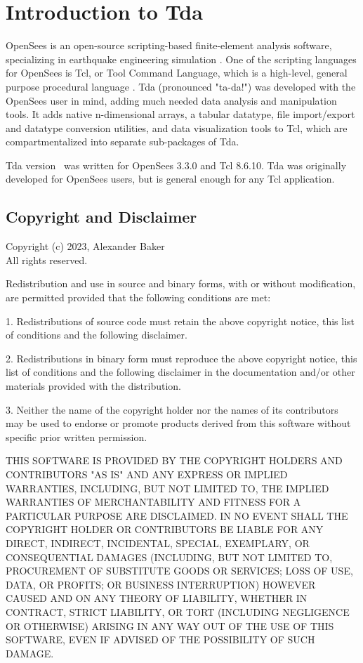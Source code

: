 \chapter*{Introduction to Tda}
OpenSees is an open-source scripting-based finite-element analysis software, specializing in earthquake engineering simulation \cite{mckenna_nonlinear_2010}. 
One of the scripting languages for OpenSees is Tcl, or Tool Command Language, which is a high-level, general purpose procedural language \cite{ousterhout_tcl_1989}. 
Tda (pronounced "ta-da!") was developed with the OpenSees user in mind, adding much needed data analysis and manipulation tools. 
It adds native n-dimensional arrays, a tabular datatype, file import/export and datatype conversion utilities, and data visualization tools to Tcl, which are compartmentalized into separate sub-packages of Tda.

Tda version \version\ was written for OpenSees 3.3.0 and Tcl 8.6.10. 
Tda was originally developed for OpenSees users, but is general enough for any Tcl application. 

\cleartooddpage[\thispagestyle{empty}]
\section*{Copyright and Disclaimer}

Copyright (c) 2023, Alexander Baker \\
All rights reserved.

Redistribution and use in source and binary forms, with or without
modification, are permitted provided that the following conditions are met:

1. Redistributions of source code must retain the above copyright notice, this
   list of conditions and the following disclaimer.

2. Redistributions in binary form must reproduce the above copyright notice,
   this list of conditions and the following disclaimer in the documentation
   and/or other materials provided with the distribution.

3. Neither the name of the copyright holder nor the names of its
   contributors may be used to endorse or promote products derived from
   this software without specific prior written permission.

THIS SOFTWARE IS PROVIDED BY THE COPYRIGHT HOLDERS AND CONTRIBUTORS "AS IS"
AND ANY EXPRESS OR IMPLIED WARRANTIES, INCLUDING, BUT NOT LIMITED TO, THE
IMPLIED WARRANTIES OF MERCHANTABILITY AND FITNESS FOR A PARTICULAR PURPOSE ARE
DISCLAIMED. IN NO EVENT SHALL THE COPYRIGHT HOLDER OR CONTRIBUTORS BE LIABLE
FOR ANY DIRECT, INDIRECT, INCIDENTAL, SPECIAL, EXEMPLARY, OR CONSEQUENTIAL
DAMAGES (INCLUDING, BUT NOT LIMITED TO, PROCUREMENT OF SUBSTITUTE GOODS OR
SERVICES; LOSS OF USE, DATA, OR PROFITS; OR BUSINESS INTERRUPTION) HOWEVER
CAUSED AND ON ANY THEORY OF LIABILITY, WHETHER IN CONTRACT, STRICT LIABILITY,
OR TORT (INCLUDING NEGLIGENCE OR OTHERWISE) ARISING IN ANY WAY OUT OF THE USE
OF THIS SOFTWARE, EVEN IF ADVISED OF THE POSSIBILITY OF SUCH DAMAGE.
